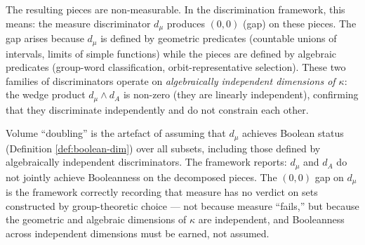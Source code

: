 \begin{example}
The resulting pieces are non-measurable. In the
discrimination framework, this means: the measure
discriminator $d_\mu$ produces $(0,0)$ (gap) on these
pieces. The gap arises because $d_\mu$ is defined by
geometric predicates (countable unions of intervals,
limits of simple functions) while the pieces are defined
by algebraic predicates (group-word classification,
orbit-representative selection). These two families of
discriminators operate on \emph{algebraically independent
dimensions of $\kappa$}: the wedge product
$d_\mu \wedge d_A$ is non-zero (they are linearly
independent), confirming that they discriminate
independently and do not constrain each other.

Volume ``doubling'' is the artefact of assuming that
$d_\mu$ achieves Boolean status
(Definition \ref{def:boolean-dim}) over all subsets,
including those defined by algebraically independent
discriminators. The framework reports: $d_\mu$ and
$d_A$ do not jointly achieve Booleanness on the
decomposed pieces. The $(0,0)$ gap on $d_\mu$ is the
framework correctly recording that measure has no
verdict on sets constructed by group-theoretic choice
--- not because measure ``fails,'' but because the
geometric and algebraic dimensions of $\kappa$ are
independent, and Booleanness across independent
dimensions must be earned, not assumed.
\end{example}


